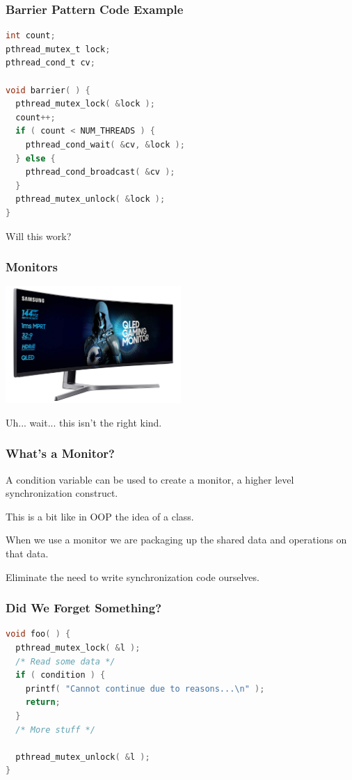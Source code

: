\begin{frame}[fragile]
	\frametitle{Barrier Pattern Code Example}
	\begin{lstlisting}[language=C]
int count;
pthread_mutex_t lock;
pthread_cond_t cv; 

void barrier( ) {
  pthread_mutex_lock( &lock );
  count++;
  if ( count < NUM_THREADS ) {
    pthread_cond_wait( &cv, &lock );
  } else {
    pthread_cond_broadcast( &cv );
  }
  pthread_mutex_unlock( &lock );
}
\end{lstlisting}

	Will this work?

\end{frame}


\begin{frame}
	\frametitle{Monitors}
	\begin{center}
		\includegraphics[width=0.5\textwidth]{images/monitor.jpg}
	\end{center}

	Uh... wait... this isn't the right kind.

\end{frame}

\begin{frame}
	\frametitle{What's a Monitor?}

	A condition variable can be used to create a \alert{monitor}, a higher level synchronization construct.

	This is a bit like in OOP the idea of a class.

	When we use a monitor we are packaging up the shared data and operations on that data.

	Eliminate the need to write synchronization code ourselves.

\end{frame}


\begin{frame}[fragile]
	\frametitle{Did We Forget Something?}

	\begin{lstlisting}[language=C]
void foo( ) {
  pthread_mutex_lock( &l );
  /* Read some data */
  if ( condition ) {
    printf( "Cannot continue due to reasons...\n" );
    return;
  }
  /* More stuff */
   
  pthread_mutex_unlock( &l );
}
\end{lstlisting}

\end{frame}


